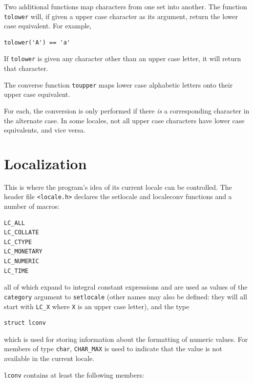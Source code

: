   Two additional functions map characters from one set into
   another. The function \texttt{tolower} will, if given a upper case
   character as its argument, return the lower case equivalent.
   For example,


  \begin{Verbatim}
tolower('A') == 'a'
\end{Verbatim}

  If \texttt{tolower} is given any character other than an  upper  case
   letter, it will return that character.


  The converse function \texttt{toupper}  maps  lower  case  alphabetic
   letters onto their upper case equivalent.


  For each, the conversion is only performed  if  there  \textit{is}  a
   corresponding  character  in  the  alternate  case.  In some
   locales, not all  upper  case  characters  have  lower  case
   equivalents, and vice versa.


 
        \section{Localization}
        

  

  This is where the program's idea of its current locale can
   be controlled.  The header file \texttt{<locale.h>} declares the
   setlocale and localeconv functions and a number of macros:


  \begin{Verbatim}
LC_ALL
LC_COLLATE
LC_CTYPE
LC_MONETARY
LC_NUMERIC
LC_TIME
\end{Verbatim}

  all of which expand to integral constant expressions and are used as
   values of the \texttt{category} argument to \texttt{setlocale}
   (other names may also be defined: they will all start with \texttt{LC\_X}
   where \texttt{X} is an upper case letter), and the type


  \begin{Verbatim}
struct lconv
\end{Verbatim}

  which is used for storing information about  the  formatting
   of numeric values.  For members of type \texttt{char},
   \texttt{CHAR\_MAX} is used to indicate that the value is not available in
   the current locale.


  \texttt{lconv} contains at least the following members:


